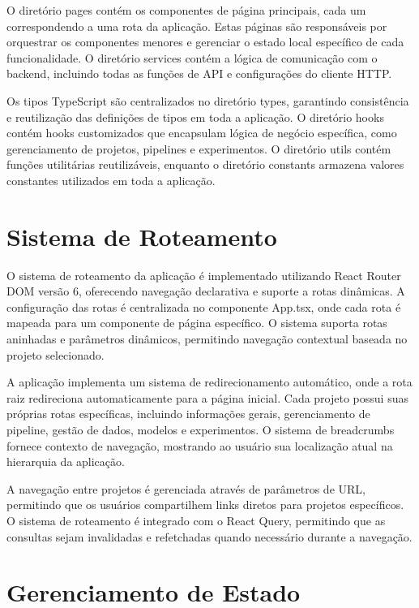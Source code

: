 \documentclass[12pt,a4paper]{article}
\begin{document}
O diretório pages contém os componentes de página principais, cada um correspondendo a uma rota da aplicação. Estas páginas são responsáveis por orquestrar os componentes menores e gerenciar o estado local específico de cada funcionalidade. O diretório services contém a lógica de comunicação com o backend, incluindo todas as funções de API e configurações do cliente HTTP.

Os tipos TypeScript são centralizados no diretório types, garantindo consistência e reutilização das definições de tipos em toda a aplicação. O diretório hooks contém hooks customizados que encapsulam lógica de negócio específica, como gerenciamento de projetos, pipelines e experimentos. O diretório utils contém funções utilitárias reutilizáveis, enquanto o diretório constants armazena valores constantes utilizados em toda a aplicação.

\section{Sistema de Roteamento}

O sistema de roteamento da aplicação é implementado utilizando React Router DOM versão 6, oferecendo navegação declarativa e suporte a rotas dinâmicas. A configuração das rotas é centralizada no componente App.tsx, onde cada rota é mapeada para um componente de página específico. O sistema suporta rotas aninhadas e parâmetros dinâmicos, permitindo navegação contextual baseada no projeto selecionado.

A aplicação implementa um sistema de redirecionamento automático, onde a rota raiz redireciona automaticamente para a página inicial. Cada projeto possui suas próprias rotas específicas, incluindo informações gerais, gerenciamento de pipeline, gestão de dados, modelos e experimentos. O sistema de breadcrumbs fornece contexto de navegação, mostrando ao usuário sua localização atual na hierarquia da aplicação.

A navegação entre projetos é gerenciada através de parâmetros de URL, permitindo que os usuários compartilhem links diretos para projetos específicos. O sistema de roteamento é integrado com o React Query, permitindo que as consultas sejam invalidadas e refetchadas quando necessário durante a navegação.

\section{Gerenciamento de Estado}
\end{document}
